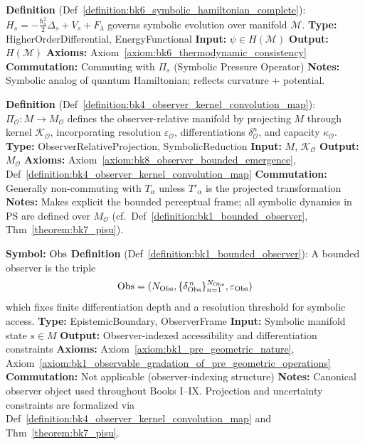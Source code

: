 \begin{description}[leftmargin=2.5cm, style=nextline]
\item[\textbf{Symbolic Hamiltonian Operator} \hfill \( H_s \)] 
\label{dict:appA_symbolic_hamiltonian_operator}
\textbf{Definition} (Def~\ref{definition:bk6_symbolic_hamiltonian_complete}): \( H_s = - \frac{\hbar_s^2}{2} \Delta_s + V_s + F_\lambda \) governs symbolic evolution over manifold \( \mathcal{M} \).
\textbf{Type:} HigherOrderDifferential, EnergyFunctional
\textbf{Input:} \( \psi \in H(\mathcal{M}) \)
\textbf{Output:} \( H(\mathcal{M}) \)
\textbf{Axioms:} Axiom~\ref{axiom:bk6_thermodynamic_consistency}
\textbf{Commutation:} Commuting with \( \Pi_s \) (Symbolic Pressure Operator)
\textbf{Notes:} Symbolic analog of quantum Hamiltonian; reflects curvature + potential.

\item[\textbf{Observer Kernel Projection} \hfill \ensuremath{\Pi_{\mathcal{O}}}] 
\label{dict:appA_observer_kernel_projection}
\textbf{Definition} (Def~\ref{definition:bk4_observer_kernel_convolution_map}): \( \Pi_{\mathcal{O}} : M \rightarrow M_{\mathcal{O}} \) defines the observer-relative manifold by projecting \( M \) through kernel \( \mathcal{K}_{\mathcal{O}} \), incorporating resolution \( \varepsilon_{\mathcal{O}} \), differentiations \( \delta^n_{\mathcal{O}} \), and capacity \( \kappa_{\mathcal{O}} \).
\textbf{Type:} ObserverRelativeProjection, SymbolicReduction
\textbf{Input:} \( M \), \( \mathcal{K}_{\mathcal{O}} \)
\textbf{Output:} \( M_{\mathcal{O}} \)
\textbf{Axioms:} Axiom~\ref{axiom:bk8_observer_bounded_emergence}, Def~\ref{definition:bk4_observer_kernel_convolution_map}
\textbf{Commutation:} Generally non-commuting with \( T_\alpha \) unless \( T'_\alpha \) is the projected transformation
\textbf{Notes:} Makes explicit the bounded perceptual frame; all symbolic dynamics in PS are defined over \( M_{\mathcal{O}} \) (cf.~Def~\ref{definition:bk1_bounded_observer}, Thm~\ref{theorem:bk7_pisu}).

\item[\textbf{Bounded Observer}] 
\label{dict:appA_bounded_observer}
\textbf{Symbol:} \( \mathrm{Obs} \)
\textbf{Definition} (Def~\ref{definition:bk1_bounded_observer}): A bounded
observer is the triple
\[
\mathrm{Obs} = (N_{\mathrm{Obs}}, \{\delta_{\mathrm{Obs}}^{\,n}\}_{n=1}^{N_{\mathrm{Obs}}}, \varepsilon_{\mathrm{Obs}})
\]
which fixes finite differentiation depth and a resolution threshold for
symbolic access.
\textbf{Type:} EpistemicBoundary, ObserverFrame
\textbf{Input:} Symbolic manifold state \( s \in M \)
\textbf{Output:} Observer-indexed accessibility and differentiation constraints
\textbf{Axioms:}
Axiom~\ref{axiom:bk1_pre_geometric_nature},
Axiom~\ref{axiom:bk1_observable_gradation_of_pre_geometric_operations}
\textbf{Commutation:} Not applicable (observer-indexing structure)
\textbf{Notes:} Canonical observer object used throughout Books I--IX.
Projection and uncertainty constraints are formalized via
Def~\ref{definition:bk4_observer_kernel_convolution_map} and
Thm~\ref{theorem:bk7_pisu}.


\end{description}

